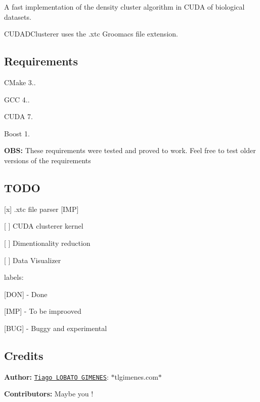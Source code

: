 A fast implementation of the density cluster algorithm in C\+U\+D\+A of biological datasets.

C\+U\+D\+A\+D\+Clusterer uses the .xtc Groomacs file extension.

\subsection*{Requirements }


\begin{DoxyItemize}
\item C\+Make 3..
\item G\+C\+C 4..
\item C\+U\+D\+A 7.
\item Boost 1.
\end{DoxyItemize}

{\bfseries O\+B\+S\+:} These requirements were tested and proved to work. Feel free to test older versions of the requirements

\subsection*{T\+O\+D\+O }


\begin{DoxyItemize}
\item \mbox{[}x\mbox{]} .xtc file parser \mbox{[}I\+M\+P\mbox{]}
\item \mbox{[} \mbox{]} C\+U\+D\+A clusterer kernel
\item \mbox{[} \mbox{]} Dimentionality reduction
\item \mbox{[} \mbox{]} Data Visualizer
\end{DoxyItemize}

labels\+:
\begin{DoxyItemize}
\item \mbox{[}D\+O\+N\mbox{]} -\/ Done
\item \mbox{[}I\+M\+P\mbox{]} -\/ To be improoved
\item \mbox{[}B\+U\+G\mbox{]} -\/ Buggy and experimental
\end{DoxyItemize}

\subsection*{Credits }

{\bfseries Author\+:} \href{https://github.com/tlgimenes}{\tt Tiago L\+O\+B\+A\+T\+O G\+I\+M\+E\+N\+E\+S}\+: $\ast$tlgimenes.com$\ast$

{\bfseries Contributors\+:} Maybe you ! 